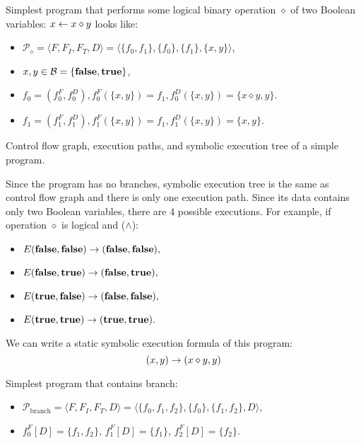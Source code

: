 
Simplest program that performs some logical binary operation $\diamond$
of two Boolean variables: $x \leftarrow x \diamond y$ looks like:
\begin{itemize}
    \item $\mathcal{P}_{\diamond} = \langle F, F_I, F_T, D \rangle =
        \langle \{f_0, f_1\}, \{f_0\}, \{f_1\}, \{x, y\} \rangle$,
    \item $x, y \in \mathcal{B} = \{\textbf{false}, \textbf{true}\}$,
    \item $f_0 = (f^F_0, f^D_0), f^F_0(\{x, y\}) = f_1,
        f^D_0(\{x, y\}) = \{x \diamond y, y\}$.
    \item $f_1 = (f^F_1, f^D_1), f^F_1(\{x, y\}) = f_1,
        f^D_1(\{x, y\}) = \{x, y\}$.
\end{itemize}

    {Control flow graph, execution paths,
        and symbolic execution tree of a simple program.}


Since the program has no branches, symbolic execution tree is the same as
control flow graph and there is only one execution path.
Since its data contains only two Boolean variables,
there are 4 possible executions.
For example, if operation $\diamond$ is logical and ($\land$):

\begin{itemize}
    \item $E(\textbf{false}, \textbf{false}) \rightarrow (\textbf{false}, \textbf{false}),$
    \item $E(\textbf{false}, \textbf{true}) \rightarrow (\textbf{false}, \textbf{true}),$
    \item $E(\textbf{true}, \textbf{false}) \rightarrow (\textbf{false}, \textbf{false}),$
    \item $E(\textbf{true}, \textbf{true}) \rightarrow (\textbf{true}, \textbf{true}).$
\end{itemize}

We can write a static symbolic execution formula of this program:
\[(x, y) \rightarrow (x \diamond y, y)\]



Simplest program that contains branch:
\begin{itemize}
    \item $\mathcal{P}_{\text{branch}} = \langle F, F_I, F_T, D \rangle =
        \langle \{f_0, f_1, f_2\}, \{f_0\}, \{f_1, f_2\}, D \rangle$,
    \item $f_0^F[D] = \{f_1, f_2\}$,
        $f_1^F[D] = \{f_1\}$, $f_2^F[D] = \{f_2\}$.
\end{itemize}

